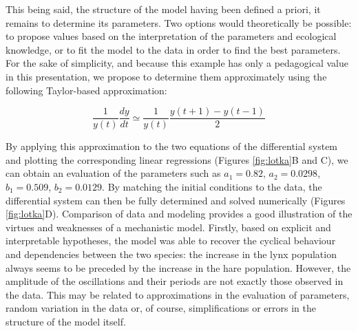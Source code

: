 \documentclass[a4paper,12pt,twoside,onecolumn,openright,final,oldfontcommands]{memoir}
\begin{document}
This being said, the structure of the model having been defined a
priori, it remains to determine its parameters. Two options would
theoretically be possible: to propose values based on the interpretation
of the parameters and ecological knowledge, or to fit the model to the
data in order to find the best parameters. For the sake of simplicity,
and because this example has only a pedagogical value in this
presentation, we propose to determine them approximately using the
following Taylor-based approximation:

\[\dfrac{1}{y(t)} \dfrac{dy}{dt} \simeq \dfrac{1}{y(t)} \dfrac{y(t+1)-y(t-1)}{2}\]

By applying this approximation to the two equations of the differential
system and plotting the corresponding linear regressions (Figures
\ref{fig:lotka}B and C), we can obtain an evaluation of the parameters
such as \(a_1=0.82\), \(a_2=0.0298\), \(b_1=0.509\), \(b_2=0.0129\). By
matching the initial conditions to the data, the differential system can
then be fully determined and solved numerically (Figures
\ref{fig:lotka}D). Comparison of data and modeling provides a good
illustration of the virtues and weaknesses of a mechanistic model.
Firstly, based on explicit and interpretable hypotheses, the model was
able to recover the cyclical behaviour and dependencies between the two
species: the increase in the lynx population always seems to be preceded
by the increase in the hare population. However, the amplitude of the
oscillations and their periods are not exactly those observed in the
data. This may be related to approximations in the evaluation of
parameters, random variation in the data or, of course, simplifications
or errors in the structure of the model itself.
\end{document}

